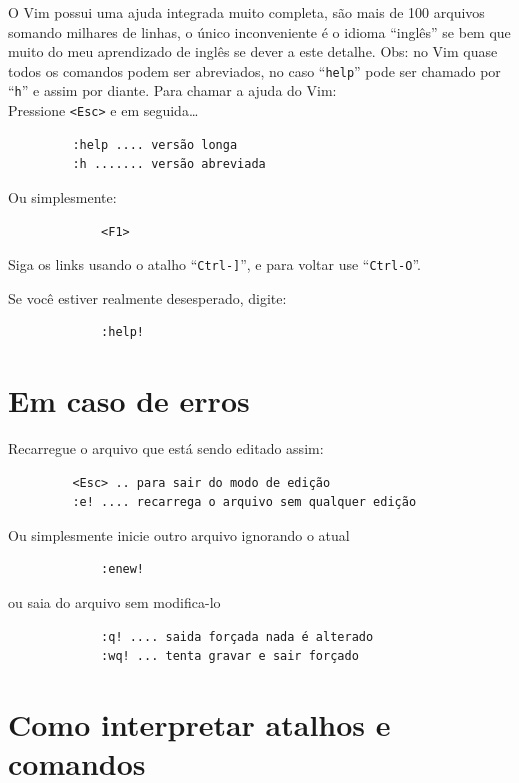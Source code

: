 \documentclass[10pt,a4paper,openany]{book}
\begin{document}
O Vim possui uma ajuda integrada muito completa, são mais de 100 arquivos
somando milhares de linhas, o único inconveniente é o idioma ``inglês'' se bem
que muito do meu aprendizado de inglês se dever a este detalhe.
Obs: no Vim quase todos os comandos podem ser abreviados, no caso
``\verb+help+'' pode ser chamado por ``\verb+h+'' e assim por diante.
Para chamar a ajuda do Vim:  \\

Pressione \verb|<Esc>| e em seguida\dots

\begin{verbatim}
		 :help .... versão longa
		 :h ....... versão abreviada
\end{verbatim}

Ou simplesmente:

\begin{verbatim}
			 <F1>
\end{verbatim}

Siga os links usando o atalho ``\verb|Ctrl-]|'', e para voltar use
  ``\verb|Ctrl-O|''.

Se você estiver realmente desesperado, digite:

\begin{verbatim}
			 :help!
\end{verbatim}



\section{Em caso de erros }\label{Em caso de erros }
Recarregue o arquivo que está sendo editado assim:

\begin{verbatim}
		 <Esc> .. para sair do modo de edição
		 :e! .... recarrega o arquivo sem qualquer edição
\end{verbatim}

Ou simplesmente inicie outro arquivo ignorando o atual

\begin{verbatim}
			 :enew!
\end{verbatim}

ou saia do arquivo sem modifica-lo

\begin{verbatim}
			 :q! .... saida forçada nada é alterado
			 :wq! ... tenta gravar e sair forçado
\end{verbatim}

\section{Como interpretar atalhos e comandos}\label{Como interpretar atalhos e comandos}
\end{document}
